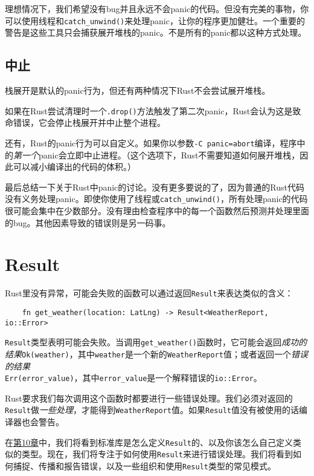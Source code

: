 理想情况下，我们希望没有bug并且永远不会panic的代码。但没有完美的事物，你可以使用线程和\texttt{catch\_unwind()}来处理panic，让你的程序更加健壮。一个重要的警告是这些工具只会捕获展开堆栈的panic。不是所有的panic都以这种方式处理。

\subsection{中止}
栈展开是默认的panic行为，但还有两种情况下Rust不会尝试展开堆栈。

如果在Rust尝试清理时一个\texttt{.drop()}方法触发了第二次panic，Rust会认为这是致命错误，它会停止栈展开并中止整个进程。

还有，Rust的panic行为可以自定义。如果你以参数\texttt{-C panic=abort}编译，程序中的\emph{第一个}panic会立即中止进程。（这个选项下，Rust不需要知道如何展开堆栈，因此可以减小编译出的代码的体积。）

最后总结一下关于Rust中panic的讨论。没有更多要说的了，因为普通的Rust代码没有义务处理panic。即使你使用了线程或\texttt{catch\_unwind()}，所有处理panic的代码很可能会集中在少数部分。没有理由检查程序中的每一个函数然后预测并处理里面的bug。其他因素导致的错误则是另一码事。

\section{Result}

Rust里没有异常，可能会失败的函数可以通过返回\texttt{Result}来表达类似的含义：
\begin{verbatim}
    fn get_weather(location: LatLng) -> Result<WeatherReport, io::Error>
\end{verbatim}
\texttt{Result}类型表明可能会失败。当调用\texttt{get\_weather()}函数时，它可能会返回\emph{成功的结果}\texttt{Ok(weather)}，其中\texttt{weather}是一个新的\texttt{WeatherReport}值；或者返回一个\emph{错误的结果}\\
\texttt{Err(error\_value)}，其中\texttt{error\_value}是一个解释错误的\texttt{io::Error}。

Rust要求我们每次调用这个函数时都要进行一些错误处理。我们必须对返回的\texttt{Result}做\emph{一些处理}，才能得到\texttt{WeatherReport}值。如果\texttt{Result}值没有被使用的话编译器也会警告。

在\hyperref[ch10]{第10章}中，我们将看到标准库是怎么定义\texttt{Result}的、以及你该怎么自己定义类似的类型。现在，我们将专注于如何使用\texttt{Result}来进行错误处理。我们将看到如何捕捉、传播和报告错误，以及一些组织和使用\texttt{Result}类型的常见模式。

